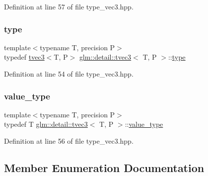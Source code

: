 Definition at line 57 of file type\+\_\+vec3.\+hpp.

\mbox{\label{structglm_1_1detail_1_1tvec3_acd2bae8742f34efdb3605e8399b5e7c1}} 
\subsubsection{\texorpdfstring{type}{type}}
{\footnotesize\ttfamily template$<$typename T, precision P$>$ \\
typedef \hyperlink{structglm_1_1detail_1_1tvec3}{tvec3}$<$T, P$>$ \hyperlink{structglm_1_1detail_1_1tvec3}{glm\+::detail\+::tvec3}$<$ T, P $>$\+::\hyperlink{structglm_1_1detail_1_1tvec3_acd2bae8742f34efdb3605e8399b5e7c1}{type}}



Definition at line 54 of file type\+\_\+vec3.\+hpp.

\mbox{\label{structglm_1_1detail_1_1tvec3_aebabd0d52c43d26ee4d66ba4606eb03c}} 
\subsubsection{\texorpdfstring{value\+\_\+type}{value\_type}}
{\footnotesize\ttfamily template$<$typename T, precision P$>$ \\
typedef T \hyperlink{structglm_1_1detail_1_1tvec3}{glm\+::detail\+::tvec3}$<$ T, P $>$\+::\hyperlink{structglm_1_1detail_1_1tvec3_aebabd0d52c43d26ee4d66ba4606eb03c}{value\+\_\+type}}



Definition at line 56 of file type\+\_\+vec3.\+hpp.



\subsection{Member Enumeration Documentation}
\mbox{\label{structglm_1_1detail_1_1tvec3_a370bdb3bb793461504b1387daec78083}} 
